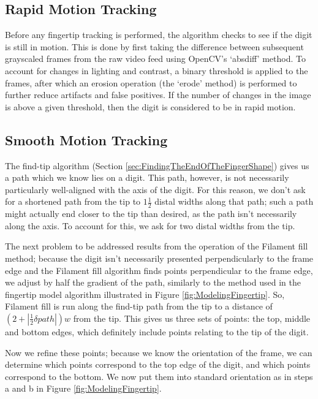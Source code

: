 \subsection{Rapid Motion Tracking}\label{sec:RapidMotionTracking}
Before any fingertip tracking is performed, the algorithm checks to see if the digit is still in motion. This is done by first taking the difference between subsequent grayscaled frames from the raw video feed using OpenCV's `absdiff' method. To account for changes in lighting and contrast, a binary threshold is applied to the frames, after which an erosion operation (the `erode' method) is performed to further reduce artifacts and false positives. If the number of changes in the image is above a given threshold, then the digit is considered to be in rapid motion.


\subsection{Smooth Motion Tracking}\label{sec:SmoothMotionTracking}

The find-tip algorithm (Section \ref{sec:FindingTheEndOfTheFingerShape}) gives us a path which we know lies on a digit. This path, however, is not necessarily particularly well-aligned with the axis of the digit. For this reason, we don't ask for a shortened path from the tip to $1 \frac{1}{2}$ distal widths along that path; such a path might actually end closer to the tip than desired, as the path isn't necessarily along the axis. To account for this, we ask for two distal widths from the tip. 

The next problem to be addressed results from the operation of the Filament fill method; because the digit isn't necessarily presented perpendicularly to the frame edge and the Filament fill algorithm finds points perpendicular to the frame edge, we adjust by half the gradient of the path, similarly to the method used in the fingertip model algorithm illustrated in Figure \ref{fig:ModelingFingertip}. So, Filament fill is run along the find-tip path from the tip to a distance of $(2+\left\lvert\frac{1}{2}\delta path\right\lvert)w$ from the tip. This gives us three sets of points: the top, middle and bottom edges, which definitely include points relating to the tip of the digit.

Now we refine these points; because we know the orientation of the frame, we can determine which points correspond to the top edge of the digit, and which points correspond to the bottom. We now put them into standard orientation as in steps a and b in Figure \ref{fig:ModelingFingertip}. 

